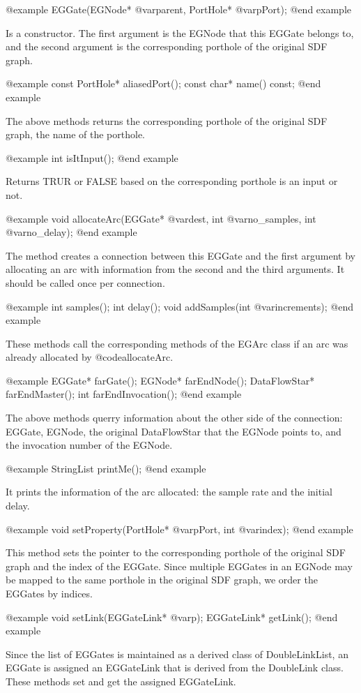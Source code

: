 @example
EGGate(EGNode* @var{parent}, PortHole* @var{pPort});
@end example

Is a constructor. The first argument is the EGNode that this EGGate
belongs to, and the second argument is the corresponding porthole of
the original SDF graph.

@example
const PortHole* aliasedPort();
const char* name() const;
@end example

The above methods returns the corresponding porthole of the original
SDF graph, the name of the porthole.

@example
int isItInput();
@end example

Returns TRUR or FALSE based on the corresponding porthole is an
input or not.

@example
void allocateArc(EGGate* @var{dest}, int @var{no_samples}, int @var{no_delay});
@end example

The method creates a connection between this EGGate and the first
argument by allocating an arc with information from the second and 
the third arguments. It should be called once per connection.

@example
int samples();
int delay();
void addSamples(int @var{increments});
@end example

These methods call the corresponding methods of the EGArc class if
an arc was already allocated by @code{allocateArc}.

@example
EGGate* farGate();
EGNode* farEndNode();
DataFlowStar* farEndMaster();
int farEndInvocation();
@end example

The above methods querry information about the other side of the connection:
EGGate, EGNode, the original DataFlowStar that the EGNode points to, and
the invocation number of the EGNode. 

@example
StringList printMe();
@end example

It prints the information of the arc allocated: the sample rate and
the initial delay.

@example
void setProperty(PortHole* @var{pPort}, int @var{index});
@end example

This method sets the pointer to the corresponding porthole of the original
SDF graph and the index of the EGGate. Since multiple EGGates in an
EGNode may be mapped to the same porthole in the original SDF graph,
we order the EGGates by indices.

@example
void setLink(EGGateLink* @var{p});
EGGateLink* getLink();
@end example

Since the list of EGGates is maintained as a derived class of DoubleLinkList,
an EGGate is assigned an EGGateLink that is derived from the DoubleLink class.
These methods set and get the assigned EGGateLink.


